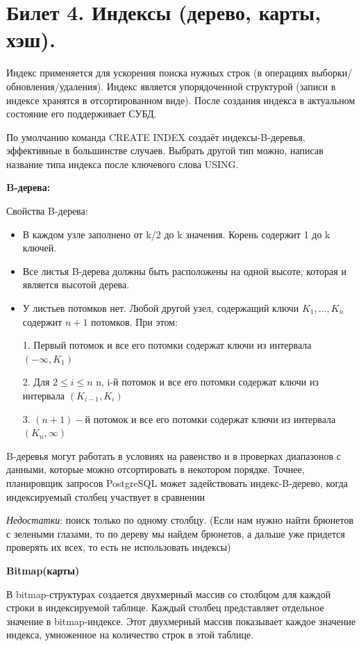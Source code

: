 \newpage
\section {Билет 4. Индексы (дерево, карты, хэш).}

Индекс применяется для ускорения поиска нужных строк (в операциях
выборки/обновления/удаления). Индекс является упорядоченной структурой (записи в индексе хранятся в отсортированном виде). После создания индекса в актуальном состояние его поддерживает СУБД.

По умолчанию команда CREATE INDEX создаёт индексы-B-деревья, эффективные в большинстве случаев. Выбрать другой тип можно, написав название типа индекса после ключевого слова USING. 

\textbf{B-дерева:} 

Свойства B-дерева: 
\begin{itemize}
	\item В каждом узле заполнено от k/2 до k значения. Корень содержит 1 до k ключей.
	\item Все листья B-дерева должны быть расположены на одной высоте, которая и является высотой дерева.
	\item У листьев потомков нет. Любой другой узел, содержащий ключи $K_{1}, …,  K_{n}$ содержит $n+1$ потомков. При этом:
	
	1. Первый потомок и все его потомки содержат ключи из интервала  $(-\infty ,K_{1})$
	
	2. Для $ 2\leq i\leq n$ n, i-й потомок и все его потомки содержат ключи из интервала $ (K_{i-1},K_{i})$ 
	
	3. $(n+1)-$й потомок и все его потомки содержат ключи из интервала $(K_{n},\infty )$
\end{itemize}


B-деревья могут работать в условиях на равенство и в проверках диапазонов с данными, которые можно отсортировать в некотором порядке. Точнее, планировщик запросов PostgreSQL может задействовать индекс-B-дерево, когда индексируемый столбец участвует в сравнении 

\textit{Недостатки}: поиск только по одному столбцу. (Если нам нужно найти брюнетов с зелеными глазами, то по дереву мы найдем брюнетов, а дальше уже придется проверять их всех, то есть не использовать индексы)

\textbf{Bitmap(карты)} 

В bitmap-структурах создается двухмерный массив со столбцом для каждой строки в индексируемой таблице. Каждый столбец представляет отдельное значение в bitmap-индексе. Этот двухмерный массив показывает каждое значение индекса, умноженное на количество строк в этой таблице.

